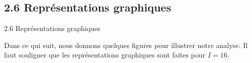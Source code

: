 \documentclass[10pt]{beamer}
\begin{document}
   
   \begin{frame} 
  \subsection{2.6 Représentations graphiques}
  \begin{block}{2.6 Représentations graphiques}\end{block}
  Dans ce qui suit, nous donnons quelques figures pour illustrer notre analyse. Il faut souligner que les représentations graphiques sont faites pour $I=16$.

  \end{frame}
  

\end{document}
